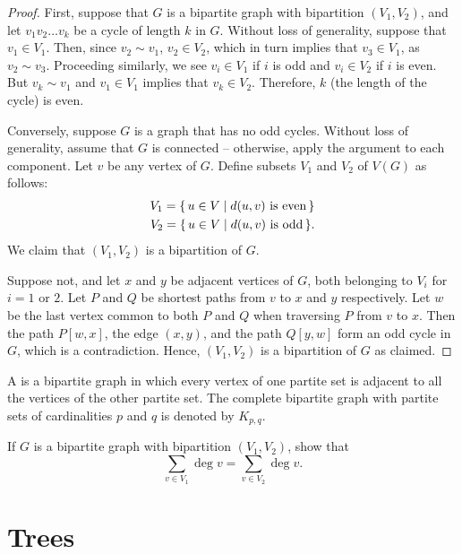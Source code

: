 \begin{proof}
First, suppose that $G$ is a bipartite graph with bipartition $(V_1, V_2)$, and let $v_1 v_2 \ldots v_k$ be a cycle of length $k$ in $G$. Without loss of generality, suppose that $v_1 \in V_1$. Then, since $v_2 \sim v_1$, $v_2 \in V_2$, which in turn implies that $v_3 \in V_1$, as $v_2 \sim v_3$. Proceeding similarly, we see $v_i \in V_1$ if $i$ is odd and $v_i \in V_2$ if $i$ is even. But $v_k \sim v_1$ and $v_1 \in V_1$ implies that $v_k \in V_2$. Therefore, $k$ (the length of the cycle) is even.

Conversely, suppose $G$ is a graph that has no odd cycles. Without loss of generality, assume that $G$ is connected -- otherwise, apply the argument to each component. Let $v$ be any vertex of $G$. Define subsets $V_1$ and $V_2$ of $V(G)$ as follows:
\begin{align*}
    V_1 = \qty{\, u \in V \mid d(u, v)\ \text{is even} \,} \\
    V_2 = \qty{\, u \in V \mid d(u, v)\ \text{is odd} \,}.
\end{align*}
We claim that $(V_1, V_2)$ is a bipartition of $G$.

Suppose not, and let $x$ and $y$ be adjacent vertices of $G$, both belonging to $V_i$ for $i = 1$ or $2$. Let $P$ and $Q$ be shortest paths from $v$ to $x$ and $y$ respectively. Let $w$ be the last vertex common to both $P$ and $Q$ when traversing $P$ from $v$ to $x$. Then the path $P[w,x]$, the edge $(x, y)$, and the path $Q[y,w]$ form an odd cycle in $G$, which is a contradiction. Hence, $(V_1, V_2)$ is a bipartition of $G$ as claimed.
\end{proof}

A  is a bipartite graph in which every vertex of one partite set is adjacent to all the vertices of the other partite set. The complete bipartite graph with partite sets of cardinalities $p$ and $q$ is denoted by $K_{p,q}$.

\begin{Exercise}
If $G$ is a bipartite graph with bipartition $(V_1, V_2)$, show that
\begin{equation*}
\sum_{v \in V_1} \deg v = \sum_{v \in V_2} \deg v.
\end{equation*}
\end{Exercise}


\section{Trees}\label{sec:Trees}

